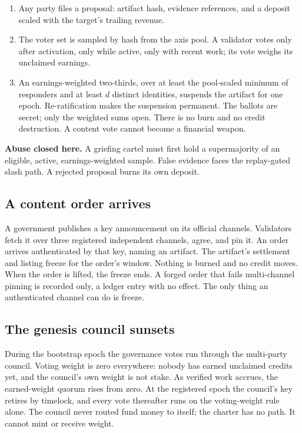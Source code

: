 \documentclass[11pt]{article}
\begin{document}
\begin{enumerate}
    \item Any party files a proposal: artifact hash, evidence
          references, and a deposit scaled with the target's trailing
          revenue.
    \item The voter set is sampled by hash from the axis pool. A
          validator votes only after activation, only while active, only
          with recent work; its vote weighs its unclaimed earnings.
    \item An earnings-weighted two-thirds, over at least the
          pool-scaled minimum of responders and at least $d$ distinct
          identities, suspends the artifact for one epoch. Re-ratification
          makes the suspension permanent. The ballots are secret; only the
          weighted sums open. There is no burn and no credit destruction.
          A content vote cannot become a financial weapon.
\end{enumerate}
\textbf{Abuse closed here.} A griefing cartel must first hold a
supermajority of an eligible, active, earnings-weighted sample.
False evidence faces the replay-gated slash path. A rejected
proposal burns its own deposit.

\subsection{A content order arrives}

A government publishes a key announcement on its official
channels. Validators fetch it over three registered independent
channels, agree, and pin it. An order arrives authenticated by
that key, naming an artifact. The artifact's settlement and
listing freeze for the order's window. Nothing is burned and no
credit moves. When the order is lifted, the freeze ends. A forged
order that fails multi-channel pinning is recorded only, a
ledger entry with no effect. The only thing an authenticated channel
can do is freeze.

\subsection{The genesis council sunsets}

During the bootstrap epoch the governance votes run through the
multi-party council. Voting weight is zero everywhere: nobody has
earned unclaimed credits yet, and the council's own weight is
not stake. As verified work accrues, the earned-weight quorum
rises from zero. At the registered epoch the council's key
retires by timelock, and every vote thereafter runs on the
voting-weight rule alone. The council never routed fund money to
itself; the charter has no path. It cannot mint or
receive weight.
\end{document}
